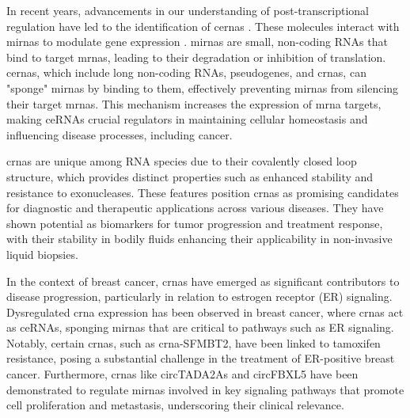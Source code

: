 In recent years, advancements in our understanding of post-transcriptional
regulation have led to the identification of \glspl{cerna}
\supercite{salmena_cerna_2011,tay_multilayered_2014}.
These molecules interact with \glspl{mirna} to modulate gene expression
\supercite{salmena_cerna_2011,li_long_2017}.
\glspl{mirna} are small, non-coding RNAs that bind to target \glspl{mrna},
leading to their degradation or inhibition of
translation\supercite{salmena_cerna_2011,tay_multilayered_2014}.
\Glspl{cerna}, which include long non-coding RNAs, pseudogenes, and
\glspl{crna}, can
"sponge" \glspl{mirna} by binding to them, effectively preventing \glspl{mirna}
from silencing their target
\glspl{mrna}\supercite{salmena_cerna_2011,poliseno_coding-independent_2010}.
This mechanism increases the expression of \gls{mrna} targets, making ceRNAs
crucial regulators in maintaining cellular homeostasis and influencing disease
processes, including cancer\supercite{salmena_cerna_2011,vo_landscape_2019}.

\Glspl{crna} are unique among RNA species due to their covalently closed loop
structure, which provides distinct properties such as enhanced stability and
resistance to exonucleases\supercite{vo_landscape_2019}.
These features position \glspl{crna} as promising candidates for diagnostic and
therapeutic applications across various
diseases\supercite{ma_circular_2020,hoque_exploring_2023,wilusz_circular_2017}.
They have shown potential as biomarkers for tumor progression and treatment
response\supercite{bao_prognostic_2020,ren_construction_2017}, with their
stability in bodily fluids enhancing their applicability in non-invasive liquid
biopsies\supercite{bao_prognostic_2020,zhang_circular_2018}.

In the context of breast cancer, \glspl{crna} have emerged as significant
contributors to disease progression, particularly in relation to estrogen
receptor (ER) signaling.
Dysregulated \gls{crna} expression has been observed in breast cancer, where
\glspl{crna} act as ceRNAs, sponging \glspl{mirna} that are critical to
pathways such as ER signaling\supercite{nair_circular_2016,xu_circrna_2022}.
Notably, certain \glspl{crna}, such as \gls{crna}-SFMBT2, have been linked to
tamoxifen resistance, posing a substantial challenge in the treatment of
ER-positive breast cancer\supercite{li_circrna-sfmbt2_2023}.
Furthermore, \glspl{crna} like circTADA2As and circFBXL5 have been demonstrated
to regulate \glspl{mirna} involved in key signaling pathways that promote cell
proliferation and metastasis, underscoring their clinical
relevance\supercite{xu_circtada2as_2019,gao_hsa_circrna_0006528_2019}.

